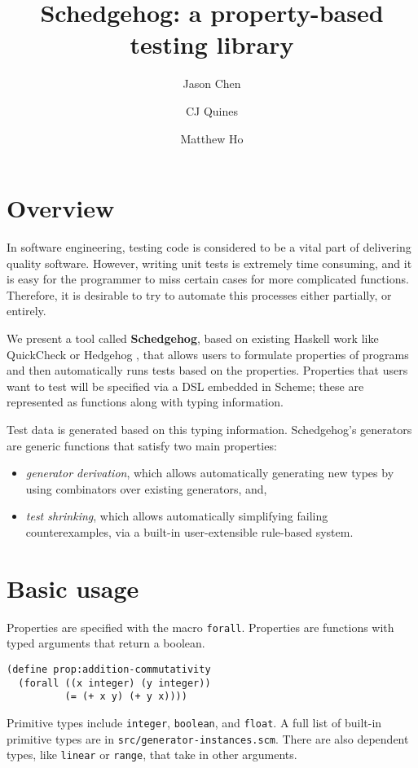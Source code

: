 \documentclass{scrartcl}
\title{Schedgehog: a property-based testing library}
\author{Jason Chen \and CJ Quines \and Matthew Ho}
\begin{document}
\maketitle

\section{Overview}

In software engineering, testing code is considered to be a vital part of
delivering quality software. However, writing unit tests is extremely time
consuming, and it is easy for the programmer to miss certain cases for more
complicated functions. Therefore, it is desirable to try to automate this
processes either partially, or entirely.

We present a tool called \textbf{Schedgehog}, based on existing Haskell work
like QuickCheck \cite{quickcheck} or Hedgehog \cite{hedgehog}, that allows
users to formulate properties of programs and then automatically runs tests
based on the properties. Properties that users want to test will be specified
via a DSL embedded in Scheme; these are represented as functions along with
typing information.

Test data is generated based on this typing information. Schedgehog's generators
are generic functions that satisfy two main properties:

\begin{itemize}
\item \textit{generator derivation}, which allows automatically generating new
types by using combinators over existing generators, and,
\item \textit{test shrinking}, which allows automatically simplifying failing
counterexamples, via a built-in user-extensible rule-based system.
\end{itemize}

\section{Basic usage}

Properties are specified with the macro \verb|forall|. Properties are functions
with typed arguments that return a boolean.

\begin{verbatim}
(define prop:addition-commutativity
  (forall ((x integer) (y integer))
          (= (+ x y) (+ y x))))
\end{verbatim}

Primitive types include \verb|integer|, \verb|boolean|, and \verb|float|. A full
list of built-in primitive types are in \verb|src/generator-instances.scm|.
There are also dependent types, like \verb|linear| or \verb|range|, that take
in other arguments.
\end{document}
